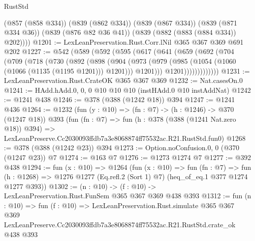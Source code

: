 \begin{lexlean}{RustStd}
\begin{coremodule}
        (@857 (@858 @334))
        (@839 (@862 @334))
        (@839 (@867 @334))
        (@839 (@871 @334 @36))
        (@839 (@876 @82 @36 @41))
        (@839 (@882 (@883 (@884 @334)) @202))))
@1201 := LexLeanPreservation.Rust.Corr.lNil @365 @367 @369 @691 @202
@1227 := @542
    (@589
      (@592
        (@595
          (@617
            (@641
              (@659
                (@692
                  (@704
                    (@709
                      (@718
                        (@730
                          (@892
                            (@898
                              (@904
                                (@973
                                  (@979
                                    (@985 (@1054 (@1060 (@1066 (@1135 (@1195 @1201))) @1201)))
                                    @1201)))
                              @1201)))))))))))))
@1231 := LexLeanPreservation.Rust.CrateOK @365 @367 @369
@1232 := Nat.casesOn.{0}
@1241 := HAdd.hAdd.{0, 0, 0} @10 @10 @10 (instHAdd.{0} @10 instAddNat)
@1242 := @1241 @438
@1246 := @378 (@388 (@1242 @18)) @394
@1247 := @1241 @436
@1264 := @1232
    (fun (y : @10) => (fn : @7) -> (h : @1246) -> @370 (@1247 @18))
    @393
    (fun (fn : @7) =>
    fun (h : @378 (@388 (@1241 Nat.zero @18)) @394) =>
    LexLeanPreserve.Cc2030093ffdb7a3e8068874ff75532ac.R21.RustStd.fun0)
@1268 := @378 (@388 (@1242 @23)) @394
@1273 := Option.noConfusion.{0, 0} (@370 (@1247 @23)) @7
@1274 := @163 @7
@1276 := @1273 @1274 @7
@1277 := @392 @438
@1294 := fun (x : @10) =>
  @1264
    (fun (x : @10) =>
    fun (fn : @7) =>
    fun (h : @1268) => @1276 @1277 (Eq.refl.{2} (Sort 1) @7) (heq_of_eq.{1} @377 @1274 @1277 @393))
@1302 := (n : @10) -> (f : @10) -> LexLeanPreservation.Rust.FunSem @365 @367 @369 @438 @393
@1312 := fun (n : @10) =>
  fun (f : @10) =>
  LexLeanPreservation.Rust.simulate
    @365
    @367
    @369
    LexLeanPreserve.Cc2030093ffdb7a3e8068874ff75532ac.R21.RustStd.crate_ok
    @438
    @393
\end{coremodule}
\end{lexlean}
